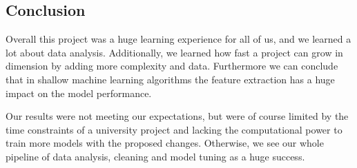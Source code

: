 \subsection{Conclusion}
Overall this project was a huge learning experience for all of us, and we learned a lot about data analysis. Additionally, we learned how fast a project can grow in dimension by adding more complexity and data. Furthermore we can conclude that in shallow machine learning algorithms the feature extraction has a huge impact on the model performance.

Our results were not meeting our expectations, but were of course limited by the time constraints of a university project and lacking the computational power to train more  models with the proposed changes. Otherwise, we see our whole pipeline of data analysis, cleaning and model tuning as a huge success.